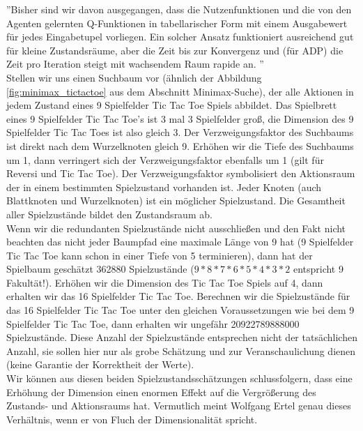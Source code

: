 ''Bisher sind wir davon ausgegangen, dass die Nutzenfunktionen und die von den Agenten gelernten Q-Funktionen in tabellarischer Form mit einem Ausgabewert für jedes Eingabetupel vorliegen. Ein solcher Ansatz funktioniert ausreichend gut für kleine Zustandsräume, aber die Zeit bis zur Konvergenz und (für ADP) die Zeit pro Iteration steigt mit wachsendem Raum rapide an. \cite[975]{Russell}''\\

Stellen wir uns einen Suchbaum vor (ähnlich der Abbildung \ref{fig:minimax_tictactoe} aus dem Abschnitt Minimax-Suche), der alle Aktionen in jedem Zustand eines 9 Spielfelder Tic Tac Toe Spiels abbildet. Das Spielbrett eines 9 Spielfelder Tic Tac Toe's ist 3 mal 3 Spielfelder groß, die Dimension des 9 Spielfelder Tic Tac Toes ist also gleich 3. Der Verzweigungsfaktor des Suchbaums ist direkt nach dem Wurzelknoten gleich 9. Erhöhen wir die Tiefe des Suchbaums um 1, dann verringert sich der Verzweigungsfaktor ebenfalls um 1 (gilt für Reversi und Tic Tac Toe). Der Verzweigungsfaktor symbolisiert den Aktionsraum der in einem bestimmten Spielzustand vorhanden ist. Jeder Knoten (auch Blattknoten und Wurzelknoten) ist ein möglicher Spielzustand. Die Gesamtheit aller Spielzustände bildet den Zustandsraum ab. \\

Wenn wir die redundanten Spielzustände nicht ausschließen und den Fakt nicht beachten das nicht jeder Baumpfad eine maximale Länge von 9 hat (9 Spielfelder Tic Tac Toe kann schon in einer Tiefe von 5 terminieren), dann hat der Spielbaum geschätzt 362880 Spielzustände ($9 * 8 * 7 * 6 * 5 * 4 * 3 * 2$ entspricht 9 Fakultät!). Erhöhen wir die Dimension des Tic Tac Toe Spiels auf 4, dann erhalten wir das 16 Spielfelder Tic Tac Toe. Berechnen wir die Spielzustände für das 16 Spielfelder Tic Tac Toe unter den gleichen Voraussetzungen wie bei dem 9 Spielfelder Tic Tac Toe, dann erhalten wir ungefähr 20922789888000 Spielzustände. Diese Anzahl der Spielzustände entsprechen nicht der tatsächlichen Anzahl, sie sollen hier nur als grobe Schätzung und zur Veranschaulichung dienen (keine Garantie der Korrektheit der Werte). \\

Wir können aus diesen beiden Spielzustandsschätzungen schlussfolgern, dass eine Erhöhung der Dimension einen enormen Effekt auf die Vergrößerung des Zustands- und Aktionsraums hat. Vermutlich meint Wolfgang Ertel genau dieses Verhältnis, wenn er von Fluch der Dimensionalität spricht. \\

